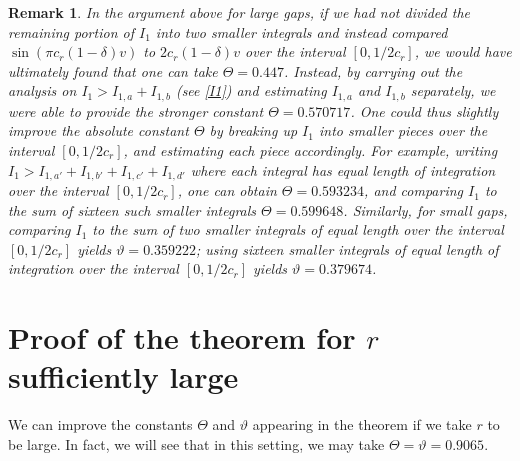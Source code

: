 \documentclass[oneside]{amsart}
\newtheorem{remark*}{Remark}
\begin{document}
\begin{remark*}In the argument above for large gaps, if we had not divided the remaining portion of $I_1$ into two smaller integrals and instead compared $\sin(\pi c_r(1-\delta)v)$ to $2c_r(1-\delta)v$ over the interval $[0, 1/2c_r]$, we would have ultimately found that one can take $\Theta = 0.447$. Instead, by carrying out the analysis on $I_1 > I_{1,a} + I_{1,b}$ (see \eqref{I1}) and estimating $I_{1,a}$ and $I_{1,b}$ separately, we were able to provide the stronger constant $\Theta = 0.570717$. One could thus slightly improve the absolute constant $\Theta$ by breaking up $I_1$ into smaller pieces over the interval $[0, 1/2c_r]$, and estimating each piece accordingly. For example, writing  $I_1 > I_{1,a'} + I_{1,b'}+I_{1,c'}+ I_{1,d'}$ where each integral has equal length of integration over the interval $[0, 1/2c_r]$, one can obtain $\Theta = 0.593234$, and comparing $I_1$ to  the sum of sixteen such smaller integrals $\Theta = 0.599648$. Similarly, for small gaps, comparing $I_1$ to the sum of two smaller integrals of equal length over the interval $[0, 1/2c_r]$ yields $\vartheta = 0.359222$; using sixteen smaller integrals of equal length of integration over the interval $[0, 1/2c_r]$ yields $\vartheta = 0.379674$.
\end{remark*}



\section{Proof of the theorem for $r$ sufficiently large} We can improve the constants $\Theta$ and $\vartheta$ appearing in the theorem if we take $r$ to be large. In fact, we will see that in this setting, we may take $\Theta = \vartheta =  0.9065.$
\end{document}
